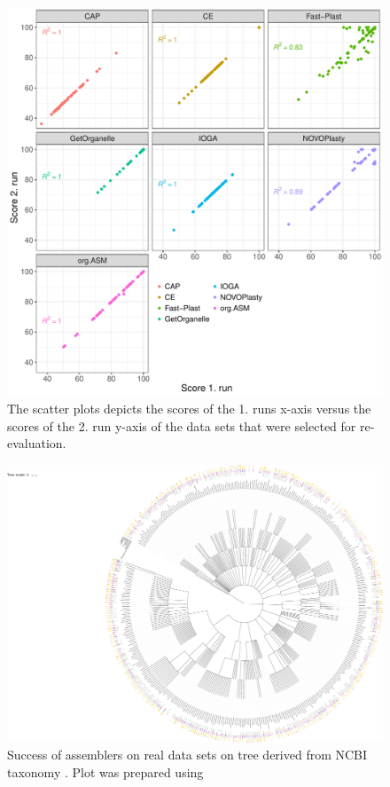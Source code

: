 \documentclass{bmcart}
\begin{document}
\begin{backmatter}
\begin{figure}[h!]
  \includegraphics[width=\textwidth]{plots/repro.pdf}
  \caption{
  The scatter plots depicts the scores of the 1. runs x-axis versus the scores of the 2. run y-axis of the data sets that were selected for re-evaluation. 
      }
      \label{fig:consistency}
      \end{figure}

\begin{figure}[h!]
  \includegraphics[width=\textwidth]{plots/real_datasets_tree.pdf}
  \caption{ Success of assemblers on real data sets on tree derived from NCBI taxonomy \cite{ncbi2011}. Plot was prepared using \cite{Letunic2019}
       }
      \label{fig:tree}
      \end{figure}


\end{backmatter}
\end{document}
